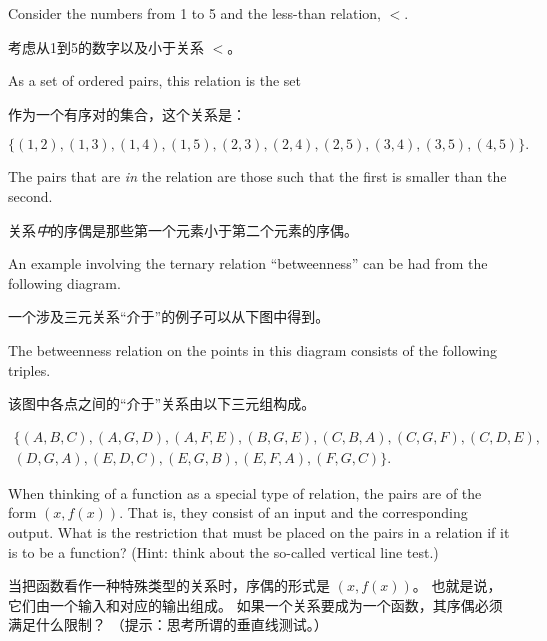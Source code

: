 Consider the numbers from 1 to 5 and the less-than relation, $<$.

考虑从1到5的数字以及小于关系 $<$。

As a set of ordered pairs, this relation is the set 

作为一个有序对的集合，这个关系是：

\[ \{(1,2), (1,3), (1,4), (1,5), (2,3), (2,4), (2,5), (3,4), (3,5), (4,5) \}.
\]

The pairs that are \emph{in} the relation are those such that the first is smaller than the second.

关系\emph{中}的序偶是那些第一个元素小于第二个元素的序偶。

An example involving the ternary relation ``betweenness'' can be had 
from the following diagram.

一个涉及三元关系“介于”的例子可以从下图中得到。

\medskip


\medskip

The betweenness relation on the points in this diagram consists of the 
following triples.

该图中各点之间的“介于”关系由以下三元组构成。

\begin{gather*} \{ (A,B,C), (A,G,D), (A,F,E), (B,G,E), (C,B,A), (C,G,F), (C,D,E), \\
(D,G,A), (E,D,C), (E,G,B), (E,F,A), (F,G,C) \}.
\end{gather*}

\begin{exer}
When thinking of a function as a special type of relation, the pairs are of
the form $(x, f(x))$.
That is, they consist of an input and the corresponding
output.
What is the restriction that must be placed on the pairs in a 
relation if it is to be a function?
(Hint: think about the so-called 
vertical line test.)
\end{exer}

\begin{exer}
当把函数看作一种特殊类型的关系时，序偶的形式是 $(x, f(x))$。
也就是说，它们由一个输入和对应的输出组成。
如果一个关系要成为一个函数，其序偶必须满足什么限制？
（提示：思考所谓的垂直线测试。）
\end{exer}

\newpage





%
%

